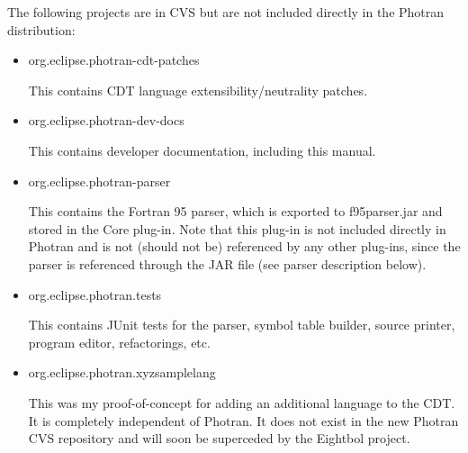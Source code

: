 \noindent The following projects are in CVS but are not included directly in the
Photran distribution:

\begin{itemize}
\item{org.eclipse.photran-cdt-patches

	This contains CDT language extensibility/neutrality patches.}

\item{org.eclipse.photran-dev-docs

	This contains developer documentation, including this manual.}

\item{org.eclipse.photran-parser

	This contains the Fortran 95 parser, which is exported to
	f95parser.jar and stored in the Core plug-in.
	Note that this plug-in is not included directly in Photran
	and is not (should not be) referenced by any other plug-ins,
	since the parser is referenced through the JAR file
	(see parser description below).}

\item{org.eclipse.photran.tests

	This contains JUnit tests for the parser, symbol table builder,
	source printer, program editor, refactorings, etc.}

\item{org.eclipse.photran.xyzsamplelang

	This was my proof-of-concept for adding an additional language to
	the CDT.  It is completely independent of Photran.  It does
        not exist in the new Photran CVS repository and will soon be
        superceded by the Eightbol project.}

\end{itemize}
